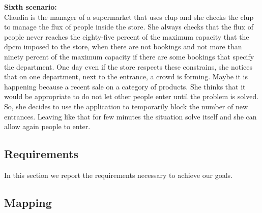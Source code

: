 \textbf{Sixth scenario:}\\
Claudia is the manager of a supermarket that uses \gls{clup} and she checks the \gls{clup} to manage the flux of people inside the store. She always checks that the flux of people never reaches the eighty-five percent of the maximum capacity that the \gls{dpcm} imposed to the store, when there are not bookings and not more than ninety percent of the maximum capacity if there are some bookings that specify the department. 
One day even if the store respects these constrains, she notices that on one department, next to the entrance, a crowd is forming. Maybe it is happening because a recent sale on a category of products. She thinks that it would be appropriate to do not let other people enter until the problem is solved. So, she decides to use the application to temporarily block the number of new entrances. Leaving like that for few minutes the situation solve itself and she can allow again people to enter.\\


\subsection{Requirements}

In this section we report the requirements necessary to achieve our goals.

\subsection{Mapping}


